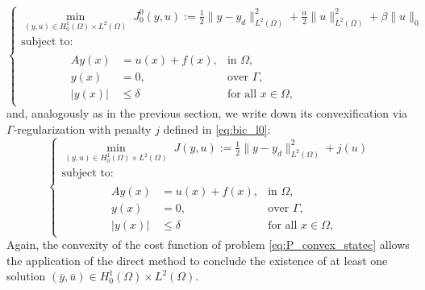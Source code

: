 \documentclass[11pt,a4paper]{amsart}
\newcommand{\om}{\Omega}
\newcommand{\norm}[1]{\lVert #1 \rVert}
\begin{document}
\begin{equation}\label{eq:P_statec}\tag{$P^0_0$}
    \begin{cases}
    \displaystyle\min_{(y,u)\in H_0^1(\om)\times L^2(\om)}\; J_0^0(y,u):=\frac{1}{2}\norm{y-y_d}^2_{L^2(\om)}+\frac{\alpha}{2}\norm{u}^2_{L^2(\om)}+\beta \norm{u}_0\\
    \mbox{subject to:}\\
    \begin{array}{rll}
    \qquad\qquad Ay(x)&=u(x) + f(x), &\mbox{in } \om,\\
        \qquad\qquad y(x)&=0,  &\mbox{over } \Gamma,\\    
        \qquad\qquad |y(x)|&\leq \delta &\mbox{for all }x\in \Omega,
     \end{array}
    \end{cases}
\end{equation}
and, analogously as in the previous section, we write down its convexification via $\Gamma$-regularization with penalty $j$ defined in \eqref{eq:bic_l0}:  
\begin{equation}\label{eq:P_convex_statec}\tag{$P_0$}
    \begin{cases}
    \displaystyle\min_{(y,u)\in H_0^1(\om)\times L^2(\om)}\; J(y,u):=\frac{1}{2}\norm{y-y_d}^2_{L^2(\om)}+j(u)\\
    \mbox{subject to:}\\
    \begin{array}{rll}
    \qquad\qquad Ay(x)&=u(x) + f(x), &\mbox{in } \om,\\
        \qquad\qquad y(x)&=0,  &\mbox{over } \Gamma,\\    
        \qquad\qquad |y(x)|&\leq \delta &\mbox{for all }x\in \Omega,
     \end{array}
    \end{cases}
\end{equation}
Again, the convexity of the cost function of problem \eqref{eq:P_convex_statec} allows the application of the direct method to conclude the existence of at least one solution $(\bar y, \bar u) \in H_0^1(\om)\times L^2(\om)$. 
\end{document}
